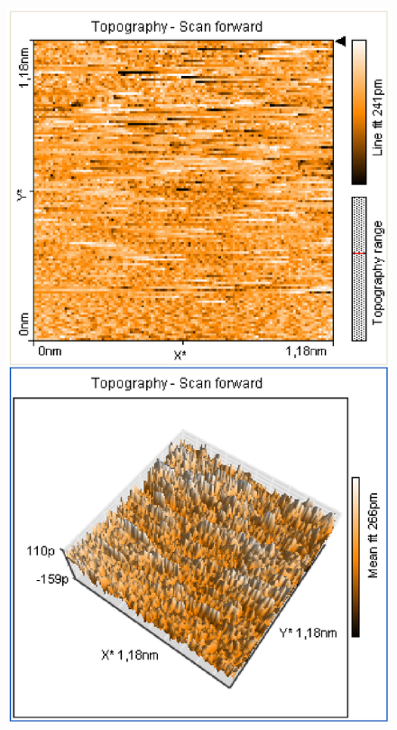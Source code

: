 \documentclass[12pt]{article}
\begin{document}
\begin{figure}[H]  
\begin{minipage}{0.4\linewidth}
\centering
\includegraphics[width=0.9\linewidth]{../plot/data/goldgitter/goldgitter5.eps}
\end{minipage}
\begin{minipage}{0.2\linewidth}
\centering
\end{minipage}
\begin{minipage}{0.4\linewidth}
\centering

\end{minipage}
\end{figure}
\end{document}
